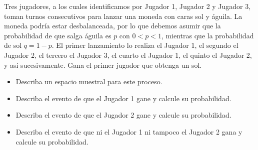 \documentclass[12pt,a4paper]{article}
\begin{document}
    \begin{mdframed}[style=mdbluebox,frametitle={Ejercicio 5}]
        Tres jugadores, a los cuales identificamos por Jugador 1, Jugador 2 y Jugador 3, toman
        turnos consecutivos para lanzar una moneda con caras sol y águila. La moneda podría estar desbalanceada,
        por lo que debemos asumir que la probabilidad de que salga águila es $p$ con $0<p<1$, mientras
        que la probabilidad de sol $q = 1-p$. El primer lanzamiento lo realiza el Jugador 1, el segundo el Jugador
        2, el tercero el Jugador 3, el cuarto el Jugador 1, el quinto el Jugador 2, y así sucesivamente. Gana el
        primer jugador que obtenga un sol.
        \begin{itemize}
            \item[(a)] Describa un espacio muestral para este proceso.
            \item[(b)] Describa el evento de que el Jugador 1 gane y calcule su probabilidad.
            \item[(c)] Describa el evento de que el Jugador 2 gane y calcule su probabilidad.
            \item[(d)] Describa el evento de que ni el Jugador 1 ni tampoco el Jugador 2 gana y calcule su probabilidad.
        \end{itemize}
    \end{mdframed}
\end{document}
